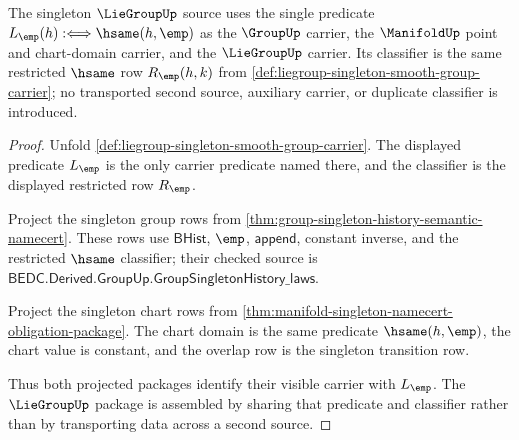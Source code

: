\begin{theorem}
\label{thm:liegroup-singleton-source-lock}
The singleton $\LieGroupUp$ source uses the single predicate
$L_{\emp}(h):\Longleftrightarrow \hsame(h,\emp)$ as the $\GroupUp$ carrier,
the $\ManifoldUp$ point and chart-domain carrier, and the $\LieGroupUp$
carrier. Its classifier is the same restricted $\hsame$ row
$R_{\emp}(h,k)$ from \autoref{def:liegroup-singleton-smooth-group-carrier};
no transported second source, auxiliary carrier, or duplicate classifier is
introduced.
\end{theorem}
\begin{proof}
Unfold \autoref{def:liegroup-singleton-smooth-group-carrier}. The displayed
predicate $L_{\emp}$ is the only carrier predicate named there, and the
classifier is the displayed restricted row $R_{\emp}$.

Project the singleton group rows from
\autoref{thm:group-singleton-history-semantic-namecert}. These rows use
$\mathsf{BHist}$, $\emp$, $\mathsf{append}$, constant inverse, and the
restricted $\hsame$ classifier; their checked source is
$\mathsf{BEDC.Derived.GroupUp.GroupSingletonHistory\_laws}$.

Project the singleton chart rows from
\autoref{thm:manifold-singleton-namecert-obligation-package}. The chart
domain is the same predicate $\hsame(h,\emp)$, the chart value is constant,
and the overlap row is the singleton transition row.

Thus both projected packages identify their visible carrier with
$L_{\emp}$. The $\LieGroupUp$ package is assembled by sharing that predicate
and classifier rather than by transporting data across a second source.
\end{proof}

